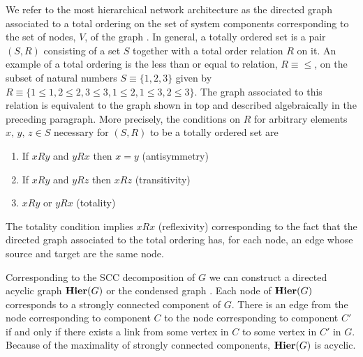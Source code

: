  We refer to the most hierarchical network architecture as the directed graph associated to a total ordering on the set of system components corresponding to the set of nodes, $V$, of the graph \cite{Cormen2009}. In general, a totally ordered set is a pair $(S,R)$ consisting of a set $S$ together with a total order relation $R$ on it. An example of a total ordering is the less than or equal to relation, $R \equiv \leq$, on the subset of natural numbers $S \equiv \{1,2,3\}$ given by $R \equiv \{1 \leq 1, 2 \leq 2, 3 \leq 3, 1 \leq 2, 1 \leq 3, 2 \leq 3\}$. The graph associated to this relation is equivalent to the graph shown in  top and described algebraically in the preceding paragraph. More precisely, the conditions on $R$ for arbitrary elements $x,\,y,\,z \in S$ necessary for $(S,R)$ to be a totally ordered set are
\begin{enumerate}
\item If $x R y$ and $y R x$ then $x=y$ (antisymmetry)
\item If $x R y$ and $y R z$ then $x R z$ (transitivity)
\item $x R y$ or $y R x$ (totality)
\end{enumerate}
The totality condition implies $x R x$ (reflexivity) corresponding to the fact that the directed graph associated to the total ordering has, for each node, an edge whose source and target are the same node.

Corresponding to the SCC decomposition of $G$ we can construct a directed acyclic graph $\mathbf{Hier} (G)$ or the condensed graph \cite{Corominas-Murtra2013}.  Each node of $\mathbf{Hier} (G)$ corresponds to a strongly connected component of $G$. There is an edge from the node corresponding to component $C$ to the node corresponding to component $C'$ if and only if there exists a link from some vertex in $C$ to some vertex in $C'$ in $G$.  Because of the maximality of strongly connected components, $\mathbf{Hier} (G)$ is acyclic.




